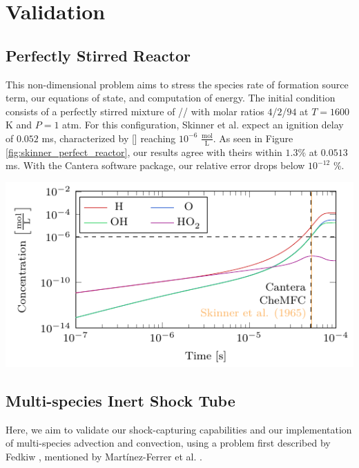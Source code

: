 \chapter{Validation}
\label{ch:validation}

\section{Perfectly Stirred Reactor}

This non-dimensional problem aims to stress the species rate of formation source
term, our equations of state, and computation of energy.
The initial condition consists of a perfectly stirred mixture of //
with molar ratios $4$/$2$/$94$ at $T=1600$ \si{\kelvin} and $P=1$ atm. For this
configuration, Skinner et al. \cite{10.1063/1.1696266} expect an ignition delay of
$0.052$ \si{\milli\second}, characterized by [] reaching $10^{-6}$ $\frac{\si{\mol}}{\si{\liter}}$.
As seen in Figure \ref{fig:skinner_perfect_reactor}, our results agree with theirs
within $1.3\%$ at $0.0513$ \si{\milli\second}. With the Cantera \cite{cantera} software
package, our relative error drops below $10^{-12}$ \%.

\begin{FigureInMulticol}
    \centering
    \includegraphics[width=\textwidth]{figures/nD_perfect_reactor/skinner.pdf}
    \label{fig:skinner_perfect_reactor}
\end{FigureInMulticol}

\section{Multi-species Inert Shock Tube}

Here, we aim to validate our shock-capturing capabilities and our implementation of
multi-species advection and convection, using a problem first described by Fedkiw
\cite{FedkiwPHD}, mentioned by Martínez-Ferrer et al. \cite{MARTINEZFERRER201488}.

